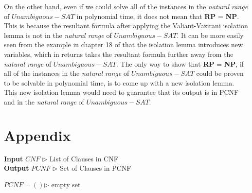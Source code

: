 \documentclass[runningheads,a4paper]{llncs}
\let\oldsim\sim
\renewcommand{\sim}{{\oldsim}}
\begin{document}
On the other hand, even if we could solve all of the instances in the \emph{natural range} of ${Unambiguous-SAT}$ in polynomial time, it does not mean that {\bf RP} = {\bf NP}. This is because the resultant formula after applying the Valiant-Vazirani isolation lemma is not in the  \emph{natural range} of ${Unambiguous-SAT}$. It can be more easily seen from the example in chapter 18 of \cite{P94} that the isolation lemma introduces new variables, which in returns takes the resultant formula further away from the \emph{natural range} of ${Unambiguous-SAT}$. The only way to show that {\bf RP} = {\bf NP}, if all of the instances in the \emph{natural range} of ${Unambiguous-SAT}$ could be proven to be solvable in polynomial time, is to come up with a new isolation lemma. This new isolation lemma would need to guarantee that its output is in PCNF and in the \emph{natural range} of ${Unambiguous-SAT}$. 


\section{Appendix}
\begin{algorithm}[H]
\caption{An algorithm that turns a CNF to PCNF}
 \hspace*{\algorithmicindent} \textbf{Input} $CNF$ {$\triangleright$ List of Clauses in CNF} \\
 \hspace*{\algorithmicindent} \textbf{Output} $PCNF$ {$\triangleright$ Set of Clauses in PCNF}
\begin{algorithmic}
\State $PCNF=()${$\triangleright$ empty set }
          \State{$temp\_c.add(re.sub('\sim','',l))$}
      \EndFor
      \EndIf
\EndFor
\end{algorithmic}
\end{algorithm}
\end{document}
